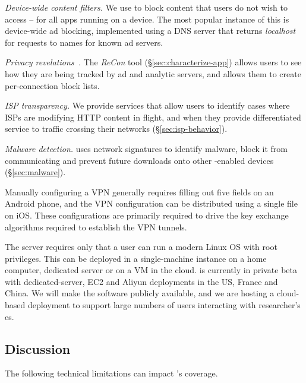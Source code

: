 \noindent \emph{Device-wide content filters.} We use \meddle to block content that users do 
not wish to access -- for all apps running on a device. The most popular instance of this is 
device-wide ad blocking, implemented using a DNS server that returns {\em localhost} for 
requests to names for known ad servers.

\noindent \emph{Privacy revelations~\cite{wetherall:revelations}.} The \emph{ReCon} tool (\S\ref{sec:characterize-app}) allows users to see how they are being 
tracked by ad and analytic servers, and allows them to create per-connection block lists.  

\noindent \emph{ISP transparency.} We provide services that allow users to identify cases where 
ISPs are modifying HTTP content in flight, and when they provide differentiated service to 
traffic crossing their networks (\S\ref{sec:isp-behavior}).

\noindent \emph{Malware detection.} \meddle uses network signatures to identify malware, block it from 
communicating and prevent future downloads onto other \meddle-enabled devices (\S\ref{sec:malware}).  

Manually configuring a VPN generally requires filling out five fields on an Android phone, and the VPN configuration can be distributed using a single file on iOS. 
These configurations are primarily required to drive the key exchange algorithms required to establish the VPN tunnels.

The \meddle server requires only that a user can run a modern Linux OS with root privileges. This can be deployed 
in a single-machine instance on a home computer, dedicated server or on a VM in the cloud. \meddle is currently in 
private beta with dedicated-server, EC2 and Aliyun deployments in the US, France and China. We will make 
the \meddle software publicly available, and we are hosting a cloud-based deployment to support large numbers 
of users interacting with researcher's {\meddlebox}es.



\subsection{Discussion}

 The following technical limitations can impact \meddle's coverage.

